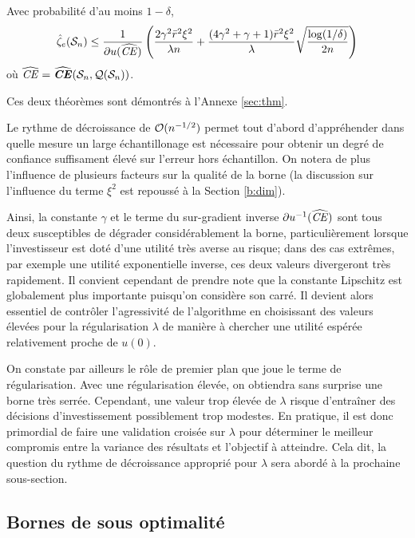 \begin{thm}
  \label{thm2}
  Avec probabilité d'au moins $1-\delta$,
  \begin{equation}
    \hat\zeta_e(\mathcal S_n) \leq \frac{1}{\partial u(\operatorname{\widehat{\operatorname{\mbox{\textit{CE}}}}})}\left( \frac{2\gamma^2\bar r^2\xi^2}{\lambda n} + \frac{(4\gamma^2 + \gamma +
        1)\bar r^2\xi^2}{\lambda}\sqrt{\frac{\log(1/\delta)}{2n}}\right) 
  \end{equation}
  où $\operatorname{\widehat{\operatorname{\mbox{\textit{CE}}}}} = \operatorname{\widehat{\operatorname{\mbox{\textbf{\textit{CE}}}}}}(\mathcal S_n,\mathcal{Q}(\mathcal S_n))$. 
\end{thm}

Ces deux théorèmes sont démontrés à l'Annexe \ref{sec:thm}.

Le rythme de décroissance de $\mathcal O(n^{-1/2})$ permet tout d'abord d'appréhender dans
quelle mesure un large échantillonage est nécessaire pour obtenir un degré de confiance
suffisament élevé sur l'erreur hors échantillon. On notera de plus l'influence de
plusieurs facteurs sur la qualité de la borne (la discussion sur l'influence du terme
$\xi^2$ est repoussé à la Section \ref{b:dim}).

Ainsi, la constante $\gamma$ et le terme du sur-gradient inverse $\partial u^{-1}(\operatorname{\widehat{\operatorname{\mbox{\textit{CE}}}}})$ sont tous
deux susceptibles de dégrader considérablement la borne, particulièrement lorsque
l'investisseur est doté d'une utilité très averse au risque; dans des cas extrêmes, par
exemple une utilité exponentielle inverse, ces deux valeurs divergeront très
rapidement. Il convient cependant de prendre note que la constante Lipschitz est
globalement plus importante puisqu'on considère son carré. Il devient alors essentiel de
contrôler l'agressivité de l'algorithme en choisissant des valeurs élevées pour la
régularisation $\lambda$ de manière à chercher une utilité espérée relativement proche de
$u(0)$.

On constate par ailleurs le rôle de premier plan que joue le terme de régularisation. Avec
une régularisation élevée, on obtiendra sans surprise une borne très serrée. Cependant,
une valeur trop élevée de $\lambda$ risque d'entraîner des décisions d'investissement
possiblement trop modestes. En pratique, il est donc primordial
de faire une validation croisée sur $\lambda$ pour déterminer le meilleur compromis entre la
variance des résultats et l'objectif à atteindre. Cela dit, la question du rythme de
décroissance approprié pour $\lambda$ sera abordé à la prochaine sous-section.


\subsection{Bornes de sous optimalité}
\label{b:sopt}


